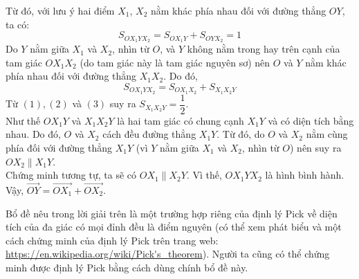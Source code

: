 \begin{bt}
{	Từ đó, với lưu ý hai điểm $X_1$, $X_2$ nằm khác phía nhau đối với đường thẳng $OY$, ta có:
	\[S_{OX_1YX_2}=S_{OX_1Y}+S_{OYX_2}=1 \tag{2}\]
	Do $Y$ nằm giữa $X_1$ và $X_2$, nhìn từ $O$, và $Y$ không nằm trong hay trên cạnh của tam giác $OX_1X_2$ (do tam giác này là tam giác nguyên sơ) nên $O$ và $Y$ nằm khác phía nhau đối với đường thẳng $X_1X_2$. Do đó, \[S_{OX_1YX_2}=S_{OX_1X_2}+S_{X_1X_2Y}\tag{3}\]
	Từ $(1), (2)$ và $(3)$ suy ra $S_{X_1X_2Y}=\dfrac{1}{2}$.\\
	Như thế $OX_1Y$ và $X_1X_2Y$ là hai tam giác có chung cạnh $X_1Y$ và có diện tích bằng nhau. Do đó, $O$ và $X_2$ cách đều đường thẳng $X_1Y$. Từ đó, do $O$ và $X_2$ nằm cùng phía đối với đường thẳng $X_1Y$ (vì $Y$ nằm giữa $X_1$ và $X_2$, nhìn từ $O$) nên suy ra $OX_2\parallel X_1Y$.\\
	Chứng minh tương tự, ta sẽ có $OX_1\parallel X_2Y$. Vì thế, $OX_1YX_2$ là hình bình hành.\\
	Vậy, $\overrightarrow{OY}=\overrightarrow{OX_1}+\overrightarrow{OX_2}$.
\begin{nx}
	Bổ đề nêu trong lời giải trên là một trường hợp riêng của định lý Pick về diện tích của đa giác có mọi đỉnh đều là điểm nguyên (có thể xem phát biểu và một cách chứng minh của định lý Pick trên trang web: \url{https://en.wikipedia.org/wiki/Pick's_theorem}). Người ta cũng có thể chứng minh được định lý Pick bằng cách dùng chính bổ đề này.
\end{nx}
}
\end{bt}



